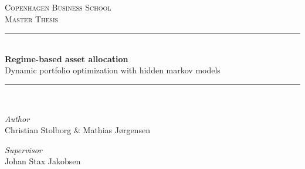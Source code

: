 

\begin{titlepage}

\newcommand{\HRule}{\rule{\linewidth}{0.5mm}} %



    


\begin{center}
    


\textsc{\Large Copenhagen Business School}\\[0.5cm] 
\textsc{\large Master Thesis}\\[0.5cm] 


\HRule \\[0.4cm]
{ \huge \bfseries Regime-based asset allocation}\\
{\Large Dynamic portfolio optimization with hidden markov models} 
\HRule \\[1.5cm]


\end{center}


\begin{center}
    \large
    \textit{Author}\\
    Christian Stolborg \& Mathias Jørgensen
    
    \textit{Supervisor}\\
    Johan Stax Jakobsen
\end{center}

\vspace{2cm}



\end{titlepage}
